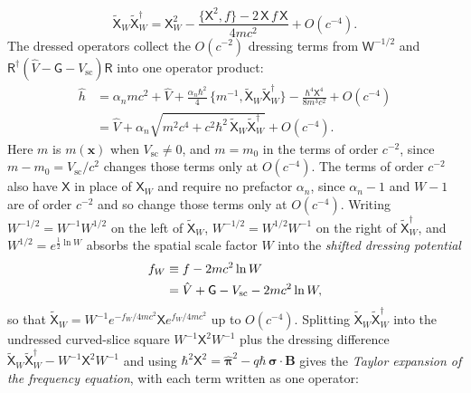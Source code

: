 \documentclass[aps,prd,onecolumn,tightenlines,nofootinbib,notitlepage,11pt,floatfix]{revtex4-2}
\theoremstyle{indentedtheorem}
\begin{document}
\begin{equation}
    \tilde{\mathsf{X}}_W\tilde{\mathsf{X}}_W^\dagger = \mathsf{X}_W^2 - \frac{\{\mathsf{X}^2,f\} - 2\,\mathsf{X}\,f\,\mathsf{X}}{4mc^2} + O(c^{-4}) .
    \label{eq:dressed_square}
\end{equation}
The dressed operators collect the $O(c^{-2})$ dressing terms from $\mathsf{W}^{-1/2}$ and $\mathsf{R}^\dagger(\hat{V}-\mathsf{G}-V_\text{sc})\mathsf{R}$ into one operator product:
\begin{align}
    \hat{h} &= \alpha_nmc^2 + \hat{V} + \frac{\alpha_n\hbar^2}{4}\,\big\{m^{-1},\tilde{\mathsf{X}}_W\tilde{\mathsf{X}}_W^\dagger\big\} - \frac{\hbar^4\mathsf{X}^4}{8m^3c^2} + O(c^{-4}) \label{eq:h_two_orders} \\
    &= \hat{V} + \alpha_n\sqrt{m^2c^4 + c^2\hbar^2\,\tilde{\mathsf{X}}_W\tilde{\mathsf{X}}_W^\dagger} + O(c^{-4}) . \label{eq:h_dressed}
\end{align}
Here $m$ is $m(\mathbf{x})$ when $V_\text{sc}\neq0$, and $m=m_0$ in the terms of order $c^{-2}$, since $m-m_0=V_\text{sc}/c^2$ changes those terms only at $O(c^{-4})$. The terms of order $c^{-2}$ also have $\mathsf{X}$ in place of $\mathsf{X}_W$ and require no prefactor $\alpha_n$, since $\alpha_n-1$ and $W-1$ are of order $c^{-2}$ and so change those terms only at $O(c^{-4})$. Writing $W^{-1/2} = W^{-1}W^{1/2}$ on the left of $\tilde{\mathsf{X}}_W$, $W^{-1/2} = W^{1/2}W^{-1}$ on the right of $\tilde{\mathsf{X}}_W^\dagger$, and $W^{1/2} = e^{\frac{1}{2}\ln W}$ absorbs the spatial scale factor $W$ into the \emph{shifted dressing potential}
\begin{align}
    f_W &\equiv f - 2mc^2\ln W \notag\\
    &= \hat{V} + \mathsf{G} - V_\text{sc} - 2mc^2\ln W ,
    \label{eq:f_W}
\end{align}
so that $\tilde{\mathsf{X}}_W = W^{-1}e^{-f_W/4mc^2}\mathsf{X}e^{f_W/4mc^2}$ up to $O(c^{-4})$. Splitting $\tilde{\mathsf{X}}_W\tilde{\mathsf{X}}_W^\dagger$ into the undressed curved-slice square $W^{-1}\mathsf{X}^2 W^{-1}$ plus the dressing difference $\tilde{\mathsf{X}}_W\tilde{\mathsf{X}}_W^\dagger - W^{-1}\mathsf{X}^2 W^{-1}$ and using $\hbar^2\mathsf{X}^2 = \hat{\boldsymbol{\pi}}^2 - q\hbar\,\boldsymbol{\sigma}\cdot\mathbf{B}$ gives the \emph{Taylor expansion of the frequency equation}, with each term written as one operator:
\end{document}
